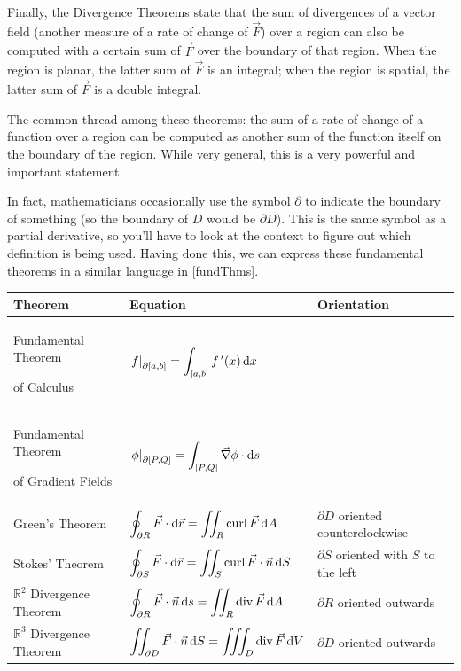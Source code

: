 Finally, the Divergence Theorems state that the sum of divergences of a vector field (another measure of a rate of change of $\vec F$) over a region can also be computed with a certain sum of $\vec F$ over the boundary of that region. When the region is planar, the latter sum of $\vec F$ is an integral; when the region is spatial, the latter sum of $\vec F$ is a double integral.

The common thread among these theorems: the sum of a rate of change of a function over a region can be computed as another sum of the function itself on the boundary of the region. While very general, this is a very powerful and important statement.


In fact, mathematicians occasionally use the symbol $\partial$ to indicate the boundary of something (so the boundary of $D$ would be $\partial D$).  This is the same symbol as a partial derivative, so you'll have to look at the context to figure out which definition is being used.  Having done this, we can express these fundamental theorems in a similar language in \autoref{fundThms}.


\clearpage

{
\begin{keyidea}\label{fundThms}%
\renewcommand{\arraystretch}{1.4}
 \begin{tabular}{p{10em} l l}
  Theorem & Equation & Orientation \\\midrule
  Fundamental Theorem\par of Calculus & $\displaystyle\left.f\right|_{\partial[a,b]}=\int_{[a,b]} f\,'(x)\operatorname{d}\! x$ &\\
  Fundamental Theorem\par of Gradient Fields & $\displaystyle\left.\phi\right|_{\partial[P,Q]}=\int_{[P,Q]}\vec\nabla\phi\cdot\operatorname{d}\! s$ & \\
  Green's Theorem & $\displaystyle\oint_{\partial R}\vec F\cdot\operatorname{d}\!\vec r=\iint_R\operatorname{curl}\vec F\operatorname{d}\! A$ & $\partial D$ oriented counterclockwise \medskip\\
  Stokes' Theorem & $\displaystyle\oint_{\partial S}\vec F\cdot\operatorname{d}\!\vec r=\iint_S\operatorname{curl}\vec F\cdot \vec n\operatorname{d}\! S$ & $\partial S$ oriented with $S$ to the left \medskip\\
  $\mathbb{R}^2$ Divergence Theorem & $\displaystyle\oint_{\partial R}\vec F\cdot\vec n\operatorname{d}\! s=\iint_R\operatorname{div}\vec F\operatorname{d}\! A$ & $\partial R$ oriented outwards \medskip\\
  $\mathbb{R}^3$ Divergence Theorem & $\displaystyle\iint_{\partial D}\vec F\cdot\vec n\operatorname{d}\! S=\iiint_D\operatorname{div}\vec F\operatorname{d}\! V$ & $\partial D$ oriented outwards
 \end{tabular}
\end{keyidea}
}


